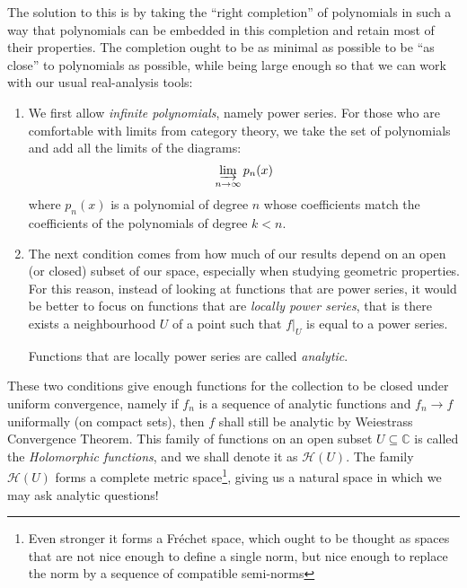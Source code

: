 \documentclass[oneside]{article}
\newcommand{\C}{\mathbb{C}}
\newcommand{\CH}{\mathcal{H}}
\newcommand{\sse}{\subseteq}
\newcommand{\colim}{\varinjlim}
\begin{document}
The solution to this is by taking the ``right completion'' of polynomials in such a way that polynomials can
be embedded in this completion and retain most of their properties. The completion ought to be as minimal
as possible to be ``as close'' to polynomials as possible, while being large enough so that we can work with
our usual real-analysis tools:

\begin{enumerate}
  \item We first allow \emph{infinite polynomials}, namely power series. For those who are comfortable with
    limits from category theory, we take the set of polynomials and add all the limits of the diagrams:
    \[
      \colim_{n \to \infty} p_n(x)
    \]
    where $p_n(x)$ is a polynomial of degree $n$ whose coefficients match the coefficients of the polynomials of
    degree $k< n$.
   \item The next condition comes from how much of our results depend on an open (or closed) subset of our
     space, especially when studying geometric properties. For this reason, instead of looking at functions
     that are power series, it would be better to focus on functions that are \emph{locally power series},
     that is there exists a neighbourhood $U$ of a point such that $f|_U$ is equal to a power series.

     Functions that are locally power series are called \emph{analytic}.
\end{enumerate}

These two conditions give enough functions for the collection to be closed under uniform convergence, namely
if $f_n$ is a sequence of analytic functions and  $f_n \to f$ uniformally (on compact sets), then $f$ shall
still be analytic by Weiestrass Convergence Theorem. This family of functions on an open subset
$U \sse \C$ is called the \emph{Holomorphic functions}, and we shall denote it as $\CH(U)$. The family
$\CH(U)$ forms a complete metric space\footnote{Even stronger it forms a Fr\'echet space, which ought to be
  thought as spaces that are not nice enough to define a single norm, but nice enough to replace the norm by a
sequence of compatible semi-norms}, giving us a natural space in which we may ask analytic questions!
\end{document}

